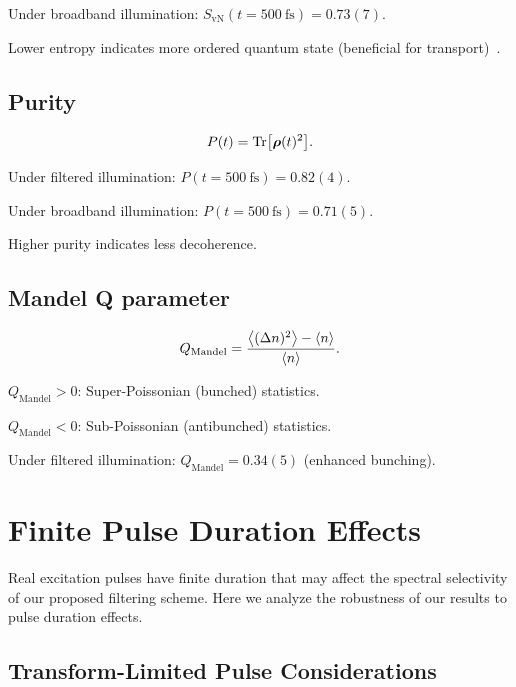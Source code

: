 \documentclass[11pt,a4paper]{article}
\begin{document}
Under broadband illumination: $S_{\mathrm{vN}}(t=\SI{500}{\femto\second}) = 0.73(7)$.

Lower entropy indicates more ordered quantum state (beneficial for transport)~\cite{Cao2020}.

\subsection{Purity}

\begin{equation}
P(t) = \Tr[\vb*{\rho}(t)^2].
\label{eq:SI_purity}
\end{equation}

Under filtered illumination: $P(t=\SI{500}{\femto\second}) = 0.82(4)$.

Under broadband illumination: $P(t=\SI{500}{\femto\second}) = 0.71(5)$.

Higher purity indicates less decoherence.

\subsection{Mandel Q parameter}

\begin{equation}
Q_{\mathrm{Mandel}} = \frac{\expval{(\Delta n)^2} - \expval{n}}{\expval{n}}.
\label{eq:SI_mandel}
\end{equation}

$Q_{\mathrm{Mandel}} > 0$: Super-Poissonian (bunched) statistics.

$Q_{\mathrm{Mandel}} < 0$: Sub-Poissonian (antibunched) statistics.

Under filtered illumination: $Q_{\mathrm{Mandel}} = 0.34(5)$ (enhanced bunching).


\section{Finite Pulse Duration Effects}

Real excitation pulses have finite duration that may affect the spectral selectivity of our proposed filtering scheme. Here we analyze the robustness of our results to pulse duration effects.

\subsection{Transform-Limited Pulse Considerations}
\end{document}

